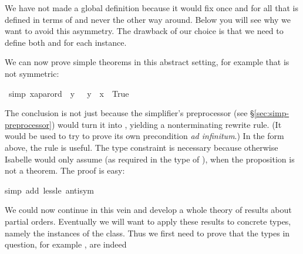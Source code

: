 \begin{isabellebody}
\begin{isamarkuptext}
We have not made  a global definition because it would
fix once and for all that \isa{{\isacharless}{\isacharless}} is defined in terms of \isa{{\isacharless}{\isacharless}{\isacharequal}} and
never the other way around. Below you will see why we want to avoid this
asymmetry. The drawback of our choice is that
we need to define both \isa{{\isacharless}{\isacharless}{\isacharequal}} and \isa{{\isacharless}{\isacharless}} for each instance.

We can now prove simple theorems in this abstract setting, for example
that \isa{{\isacharless}{\isacharless}} is not symmetric:%
\end{isamarkuptext}%
\isamarkuptrue%
\isamarkupfalse%
\ {\isacharbrackleft}simp{\isacharbrackright}{\isacharcolon}\ {\isachardoublequoteopen}{\isacharparenleft}x{\isacharcolon}{\isacharcolon}{\isacharprime}a{\isacharcolon}{\isacharcolon}parord{\isacharparenright}\ {\isacharless}{\isacharless}\ y\ {\isasymLongrightarrow}\ {\isacharparenleft}{\isasymnot}\ y\ {\isacharless}{\isacharless}\ x{\isacharparenright}\ {\isacharequal}\ True{\isachardoublequoteclose}%
\isadelimproof
%
\endisadelimproof
%
\isatagproof
%
\begin{isamarkuptxt}%
\noindent
The conclusion is not just  because the 
simplifier's preprocessor (see \S\ref{sec:simp-preprocessor})
would turn it into , yielding
a nonterminating rewrite rule.  
(It would be used to try to prove its own precondition \emph{ad
    infinitum}.)
In the form above, the rule is useful.
The type constraint is necessary because otherwise Isabelle would only assume
 (as required in the type of \isa{{\isacharless}{\isacharless}}), 
when the proposition is not a theorem.  The proof is easy:%
\end{isamarkuptxt}%
\isamarkuptrue%
\isamarkupfalse%
{\isacharparenleft}simp\ add{\isacharcolon}\ less{\isacharunderscore}le\ antisym{\isacharparenright}%
\endisatagproof
{\isafoldproof}%
%
\isadelimproof
%
\endisadelimproof
%
\begin{isamarkuptext}%
We could now continue in this vein and develop a whole theory of
results about partial orders. Eventually we will want to apply these results
to concrete types, namely the instances of the class. Thus we first need to
prove that the types in question, for example , are indeed

\end{isamarkuptext}
\end{isabellebody}
